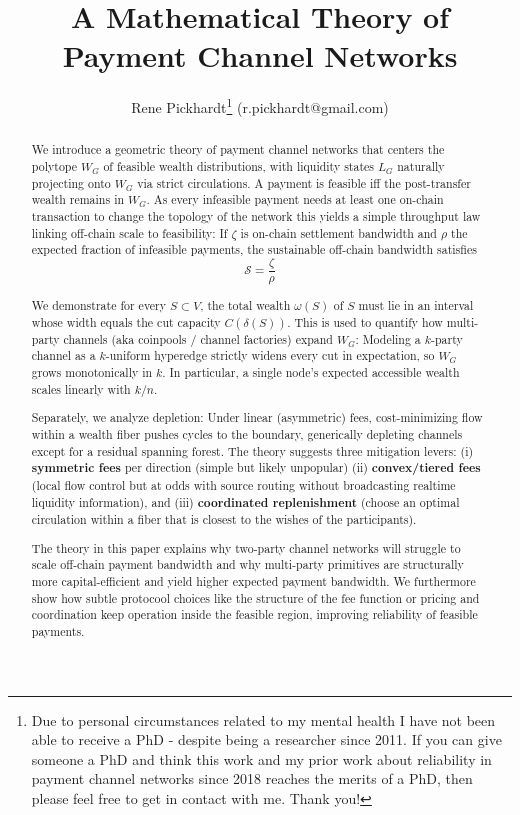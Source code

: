 \documentclass[10pt,twocolumn]{article}
\title{A Mathematical Theory of Payment Channel Networks}
\author{Rene Pickhardt\thanks{Due to personal circumstances related to my mental health I have not been able to receive a PhD - despite being a researcher since 2011. If you can give someone a PhD and think this work and my prior work about reliability in payment channel networks since 2018 reaches the merits of a PhD, then please feel free to get in contact with me. Thank you!} (r.pickhardt@gmail.com)}
\begin{document}
 
\maketitle

\begin{abstract}
We introduce a geometric theory of payment channel networks that centers the polytope $W_G$ of feasible wealth distributions, with liquidity states $L_G$ naturally projecting onto $W_G$ via strict circulations. A payment is feasible iff the post-transfer wealth remains in $W_G$. As every infeasible payment needs at least one on-chain transaction to change the topology of the network this yields a simple throughput law linking off-chain scale to feasibility: If $\zeta$ is on-chain settlement bandwidth and $\rho$ the expected fraction of infeasible payments, the sustainable off-chain bandwidth satisfies
\[
\mathcal{S}=\frac{\zeta}{\rho}
\]

We demonstrate for every $S\subset V$, the total wealth $\omega(S)$ of $S$ must lie in an interval whose width equals the cut capacity $C(\delta(S))$. This is used to quantify how multi-party channels (aka coinpools / channel factories) expand $W_G$: Modeling a $k$-party channel as a $k$-uniform hyperedge strictly widens every cut in expectation, so $W_G$ grows monotonically in $k$. In particular, a single node’s expected accessible wealth scales linearly with $k/n$.

Separately, we analyze depletion: Under linear (asymmetric) fees, cost-minimizing flow within a wealth fiber pushes cycles to the boundary, generically depleting channels except for a residual spanning forest. The theory suggests three mitigation levers: (i) \textbf{symmetric fees} per direction (simple but likely unpopular) (ii) \textbf{convex/tiered fees} (local flow control but at odds with source routing without broadcasting realtime liquidity information), and (iii) \textbf{coordinated replenishment} (choose an optimal circulation within a fiber that is closest to the wishes of the participants).

The theory in this paper explains why two-party channel networks will struggle to scale off-chain payment bandwidth and why multi-party primitives are structurally more capital-efficient and yield higher expected payment bandwidth. We furthermore show how subtle protocool choices like the structure of the fee function or pricing and coordination keep operation inside the feasible region, improving reliability of feasible payments.
\end{abstract}
\end{document}
